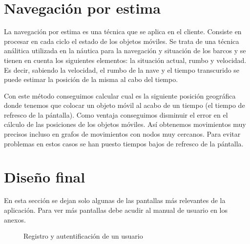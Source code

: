 \newpage

\section{Navegación por estima}


La navegación por estima es una técnica que se aplica en el cliente. Consiste en procesar en cada ciclo el estado de los objetos móviles. Se trata de una técnica análitica utilizada en la náutica para la navegación y situación de los barcos y se tienen en cuenta los siguientes elementos: la situación actual, rumbo y velocidad. Es decir, sabiendo la velocidad, el rumbo de la nave y el tiempo transcurido se puede estimar la posición de la misma al cabo del tiempo. 

Con este método conseguimos calcular cual es la siguiente posición geográfica donde tenemos que colocar un objeto móvil al acabo de un tiempo (el tiempo de refresco de la pántalla). Como ventaja conseguimos disminuir el error en el cálculo de las posiciones de los objetos móviles. Así obtenemos movimientos muy precisos incluso en grafos de movimientos con nodos muy cercanos. Para evitar problemas en estos casos se han puesto tiempos bajos de refresco de la pántalla.

\section{Diseño final}

En esta sección se dejan solo algunas de las pantallas más relevantes de la aplicación. Para ver más pantallas debe acudir al manual de usuario en los anexos.

\begin{figure}[H]
 \centering
 \caption{Registro y autentificación de un usuario}
 \label{f:LoginRegister}
\end{figure}

